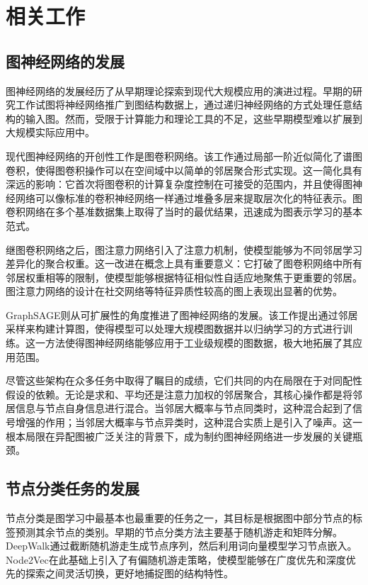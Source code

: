 \documentclass[a4paper,10pt]{article}
\begin{document}
\section{相关工作}

\subsection{图神经网络的发展}

图神经网络的发展经历了从早期理论探索到现代大规模应用的演进过程。早期的研究工作试图将神经网络推广到图结构数据上，通过递归神经网络的方式处理任意结构的输入图。然而，受限于计算能力和理论工具的不足，这些早期模型难以扩展到大规模实际应用中。

现代图神经网络的开创性工作是图卷积网络\cite{gcn}。该工作通过局部一阶近似简化了谱图卷积，使得图卷积操作可以在空间域中以简单的邻居聚合形式实现。这一简化具有深远的影响：它首次将图卷积的计算复杂度控制在可接受的范围内，并且使得图神经网络可以像标准的卷积神经网络一样通过堆叠多层来提取层次化的特征表示。图卷积网络在多个基准数据集上取得了当时的最优结果，迅速成为图表示学习的基本范式。

继图卷积网络之后，图注意力网络\cite{gat}引入了注意力机制，使模型能够为不同邻居学习差异化的聚合权重。这一改进在概念上具有重要意义：它打破了图卷积网络中所有邻居权重相等的限制，使模型能够根据特征相似性自适应地聚焦于更重要的邻居。图注意力网络的设计在社交网络等特征异质性较高的图上表现出显著的优势。

GraphSAGE\cite{graphsage}则从可扩展性的角度推进了图神经网络的发展。该工作提出通过邻居采样来构建计算图，使得模型可以处理大规模图数据并以归纳学习的方式进行训练。这一方法使得图神经网络能够应用于工业级规模的图数据，极大地拓展了其应用范围。

尽管这些架构在众多任务中取得了瞩目的成绩，它们共同的内在局限在于对同配性假设的依赖。无论是求和、平均还是注意力加权的邻居聚合，其核心操作都是将邻居信息与节点自身信息进行混合。当邻居大概率与节点同类时，这种混合起到了信号增强的作用；当邻居大概率与节点异类时，这种混合实质上是引入了噪声。这一根本局限在异配图被广泛关注的背景下，成为制约图神经网络进一步发展的关键瓶颈。

\subsection{节点分类任务的发展}

节点分类是图学习中最基本也最重要的任务之一，其目标是根据图中部分节点的标签预测其余节点的类别。早期的节点分类方法主要基于随机游走和矩阵分解。DeepWalk\cite{deepwalk}通过截断随机游走生成节点序列，然后利用词向量模型学习节点嵌入。Node2Vec\cite{node2vec}在此基础上引入了有偏随机游走策略，使模型能够在广度优先和深度优先的探索之间灵活切换，更好地捕捉图的结构特性。
\end{document}
